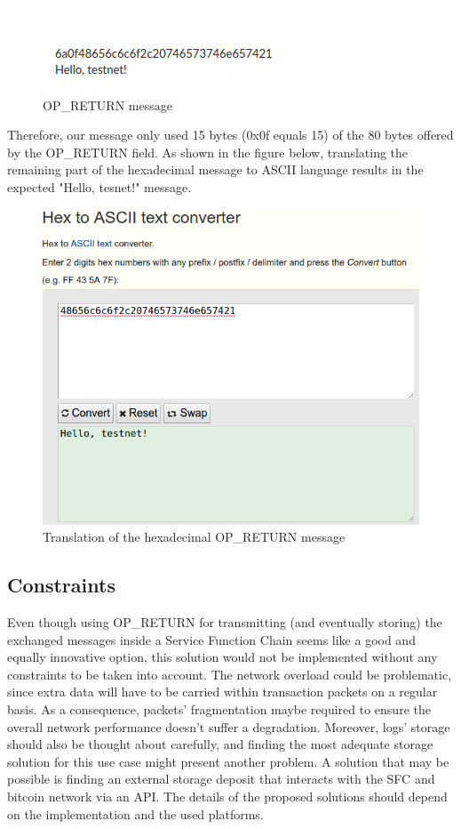 \newpage  
\begin{figure}[htp]
    \centering
    \includegraphics[scale=0.52]{op3}
    \caption{OP\_RETURN message}
\end{figure}
Therefore, our message only used 15 bytes (0x0f equals 15) of the 80 bytes offered by the OP\_RETURN field. As shown in the figure below, translating the remaining part of the hexadecimal message to ASCII language results in the expected "Hello, tesnet!" message.
\begin{figure}[htp]
    \centering
    \includegraphics[scale=0.42]{op4}
    \caption{Translation of the hexadecimal OP\_RETURN message}
\end{figure}

\subsection{Constraints}
Even though using OP\_RETURN for transmitting (and eventually storing) the exchanged messages inside a Service Function Chain seems like a good and equally innovative option, this solution would not be implemented without any constraints to be taken into account. The network overload could be problematic, since extra data will have to be carried within transaction packets on a regular basis. As a consequence, packets' fragmentation maybe required to ensure the overall network performance doesn't suffer a degradation. Moreover, logs' storage should also be thought about carefully, and finding the most adequate storage solution for this use case might present another problem. A solution that may be possible is finding an external storage deposit that interacts with the SFC and bitcoin network via an API. The details of the  proposed solutions should depend on the implementation and the used platforms. 
\newpage
